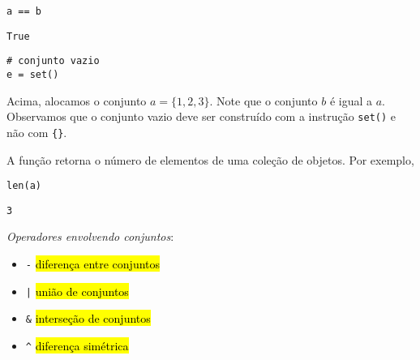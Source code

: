 \documentclass[a4paper,10pt,twoside]{article}
\begin{document}
\begin{lstlisting}
a == b
\end{lstlisting}

\begin{verbatim}
True
\end{verbatim}

\begin{lstlisting}
# conjunto vazio
e = set()  
\end{lstlisting}

Acima, alocamos o conjunto $a = \{1,2, 3\}$. Note que o conjunto $b$ é igual a $a$. Observamos que o conjunto vazio deve ser construído com a instrução \texttt{set()} e não com \texttt{\{\}}.

\begin{obs}
  A função {\PYTHONlen} retorna o número de elementos de uma coleção de objetos. Por exemplo,
  
\begin{lstlisting}
len(a)
\end{lstlisting}

\begin{verbatim}
3
\end{verbatim}

\end{obs}

\emph{Operadores envolvendo conjuntos}:
\begin{itemize}
\item[] \texttt{-} \hl{diferença entre conjuntos}
\item[] \texttt{|} \hl{união de conjuntos}
\item[] \texttt{\&} \hl{interseção de conjuntos}
\item[] \texttt{\^} \hl{diferença simétrica}
\end{itemize}
\end{document}
